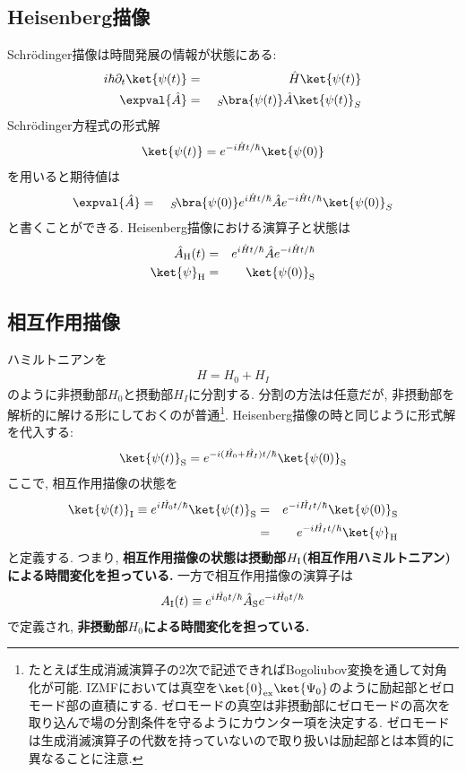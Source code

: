 \subsection{Heisenberg描像}
Schr\"odinger描像は時間発展の情報が状態にある:
\begin{eqnarray}
  i\hbar\partial_t\ket{\psi(t)} &=& \hat{H}\ket{\psi(t)}\\
  \expval{\hat{A}} &=&\ _S\!\bra{\psi(t)}\hat{A}\ket{\psi(t)}_S
\end{eqnarray}
Schr\"odinger方程式の形式解
\begin{eqnarray}
  \ket{\psi(t)} = e^{-i\hat{H}t/\hbar}\ket{\psi(0)}
\end{eqnarray}
を用いると期待値は
\begin{eqnarray}
  \expval{\hat{A}} &=&\ _S\!\bra{\psi(0)}e^{i\hat{H}t/\hbar}\hat{A}e^{-i\hat{H}t/\hbar}\ket{\psi(0)}_S
\end{eqnarray}
と書くことができる. Heisenberg描像における演算子と状態は
\begin{eqnarray}
  \hat{A}_{\rm H}(t) &=& e^{i\hat{H}t/\hbar}\hat{A}e^{-i\hat{H}t/\hbar}\\
  \ket{\psi}_{\rm H} &=&  \ket{\psi(0)}_{\rm S}
\end{eqnarray}
\subsection{相互作用描像}
ハミルトニアンを
\begin{eqnarray}
  H = H_0 + H_I
\end{eqnarray}
のように非摂動部$H_0$と摂動部$H_I$に分割する. 分割の方法は任意だが, 非摂動部を解析的に解ける形にしておくのが普通\footnote{たとえば生成消滅演算子の2次で記述できればBogoliubov変換を通して対角化が可能. IZMFにおいては真空を$\ket{0}_{\rm ex}\ket{\Psi_0}$のように励起部とゼロモード部の直積にする. ゼロモードの真空は非摂動部にゼロモードの高次を取り込んで場の分割条件を守るようにカウンター項を決定する. ゼロモードは生成消滅演算子の代数を持っていないので取り扱いは励起部とは本質的に異なることに注意. }. Heisenberg描像の時と同じように形式解を代入する:
\begin{eqnarray}
  \ket{\psi(t)}_{\rm S} = e^{-i(\hat{H_0} + \hat{H_I})t/\hbar}\ket{\psi(0)}_{\rm S}
\end{eqnarray}
ここで, 相互作用描像の状態を
\begin{eqnarray}
  \ket{\psi(t)}_{\rm I} \equiv e^{i\hat{H_0}t/\hbar}\ket{\psi(t)}_{\rm S} &=& e^{-i\hat{H_I}t/\hbar}\ket{\psi(0)}_{\rm S}\\
  &=& e^{-i\hat{H_I}t/\hbar}\ket{\psi}_{\rm H}
\end{eqnarray}
と定義する. つまり, \textbf{相互作用描像の状態は摂動部$H_{\rm I}$(相互作用ハミルトニアン)による時間変化を担っている. }一方で相互作用描像の演算子は
\begin{eqnarray}
  A_{\rm I}(t) \equiv e^{i\hat{H_0}t/\hbar}\hat{A}_{\rm S}e^{-i\hat{H_0}t/\hbar}
\end{eqnarray}
で定義され, \textbf{非摂動部$H_0$による時間変化を担っている. }

